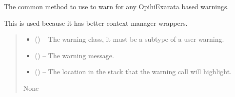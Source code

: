 \documentclass[letterpaper,11pt,english]{sphinxmanual}
\begin{document}
\begin{savenotes}\begin{fulllineitems}
\label{\detokenize{code/opihiexarata.library.error:opihiexarata.library.error.warn}}
\pysigstartsignatures
{}
\pysigstopsignatures
\sphinxAtStartPar
The common method to use to warn for any OpihiExarata based warnings.

\sphinxAtStartPar
This is used because it has better context manager wrappers.
\begin{quote}\begin{description}
\begin{itemize}
\item {} 
\sphinxAtStartPar
{} (\sphinxstyleliteralemphasis{\sphinxupquote{, }}) – The warning class, it must be a subtype of a user warning.

\item {} 
\sphinxAtStartPar
{} (\sphinxstyleliteralemphasis{\sphinxupquote{, }}) – The warning message.

\item {} 
\sphinxAtStartPar
{} (\sphinxstyleliteralemphasis{\sphinxupquote{, }}) – The location in the stack that the warning call will highlight.

\end{itemize}

\sphinxAtStartPar
None

\end{description}\end{quote}

\end{fulllineitems}\end{savenotes}
\end{document}
